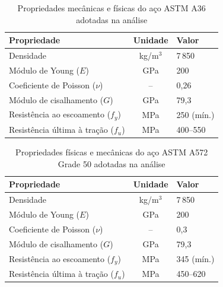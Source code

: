 \documentclass[12pt, a4paper]{article}
\begin{document}
\begin{table}[ht]
\centering
\caption{Propriedades mecânicas e físicas do aço ASTM A36 adotadas na análise}
\label{tab:astm_a36_analysis}
\renewcommand{\arraystretch}{1.2}

\begin{tabularx}{0.75\textwidth}{|l|c|X|}
\toprule
\textbf{Propriedade} & \textbf{Unidade} & \textbf{Valor} \\
\midrule
Densidade & kg/m$^3$ & 7\,850 \\
Módulo de Young ($E$) & GPa & 200 \\
Coeficiente de Poisson ($\nu$) & -- & 0,26 \\
Módulo de cisalhamento ($G$) & GPa & 79,3 \\
Resistência ao escoamento ($f_y$) & MPa & 250 (mín.) \\
Resistência última à tração ($f_u$) & MPa & 400--550 \\
\bottomrule
\end{tabularx}
\end{table}
\begin{table}[ht]
\centering
\caption{Propriedades físicas e mecânicas do aço ASTM A572 Grade 50 adotadas na análise}
\label{tab:astm_a572_gr50}
\renewcommand{\arraystretch}{1.2}

\begin{tabularx}{0.75\textwidth}{|l|c|X|}
\toprule
\textbf{Propriedade} & \textbf{Unidade} & \textbf{Valor} \\
\midrule
Densidade & kg/m$^3$ & 7\,850 \\
Módulo de Young ($E$) & GPa & 200 \\
Coeficiente de Poisson ($\nu$) & -- & 0,3 \\
Módulo de cisalhamento ($G$) & GPa & 79,3 \\
Resistência ao escoamento ($f_y$) & MPa & 345 (mín.) \\
Resistência última à tração ($f_u$) & MPa & 450--620 \\
\bottomrule
\end{tabularx}
\end{table}


\end{document}
